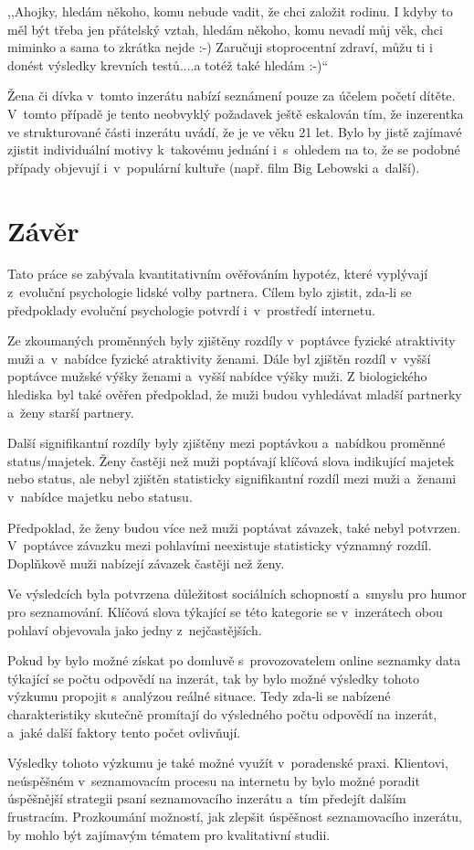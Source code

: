 \documentclass[a4paper, 12pt, notitlepage, oneside, numbers=noenddot]{report}
\begin{document}
,,Ahojky, hledám někoho, komu nebude vadit, že chci založit rodinu. I
kdyby to měl být třeba jen přátelský vztah, hledám někoho, komu nevadí
můj věk, chci miminko a sama to zkrátka nejde :-) Zaručuji
stoprocentní zdraví, můžu ti i donést výsledky krevních testů....a
totéž také hledám :-)``

Žena či dívka v~tomto inzerátu nabízí seznámení pouze za účelem početí
dítěte.  V~tomto případě je tento neobvyklý požadavek ještě eskalován
tím, že inzerentka ve strukturované části inzerátu uvádí, že je ve
věku 21 let. Bylo by jistě zajímavé zjistit individuální motivy
k~takovému jednání i~s~ohledem na to, že se podobné případy objevují
i~v~populární kultuře (např. film Big Lebowski a~další).

\chapter{Závěr}

Tato práce se zabývala kvantitativním ověřováním hypotéz, které
vyplývají z~evoluční psychologie lidské volby partnera.  Cílem bylo
zjistit, zda-li se předpoklady evoluční psychologie potvrdí
i~v~prostředí internetu.

Ze zkoumaných proměnných byly zjištěny rozdíly v~poptávce fyzické
atraktivity muži a~v~nabídce fyzické atraktivity ženami.  Dále byl
zjištěn rozdíl v~vyšší poptávce mužské výšky ženami a~vyšší nabídce
výšky muži.  Z biologického hlediska byl také ověřen před\-po\-klad, že
muži budou vyhledávat mladší partnerky a~ženy starší partnery.

Další signifikantní rozdíly byly zjištěny mezi poptávkou a~nabídkou
proměnné status/majetek.  Ženy častěji než muži poptávají klíčová
slova indikující majetek nebo status, ale nebyl zjištěn statisticky
signifikantní rozdíl mezi muži a~ženami v~nabídce majetku nebo statusu.

Předpoklad, že ženy budou více než muži poptávat závazek, také nebyl
potvrzen.  V~poptávce závazku mezi pohlavími neexistuje statisticky
významný rozdíl.  Doplňkově muži nabízejí závazek častěji než ženy.

Ve výsledcích byla potvrzena důležitost sociálních schopností a~smyslu
pro humor pro seznamování.  Klíčová slova týkající se této kategorie
se v~inzerátech obou pohlaví objevovala jako jedny z~nejčastějších.

Pokud by bylo možné získat po domluvě s~provozovatelem online seznamky
data týkající se počtu odpovědí na inzerát, tak by bylo možné výsledky
tohoto výzkumu propojit s~analýzou reálné situace.  Tedy zda-li se
nabízené charakteristiky skutečně promítají do výsledného počtu
odpovědí na inzerát, a~jaké další faktory tento počet ovlivňují.

Výsledky tohoto výzkumu je také možné využít v~poradenské praxi.
Klientovi, ne\-ús\-pě\-š\-ném v~seznamovacím procesu na internetu by bylo
možné poradit úspěšnější strategii psaní seznamovacího inzerátu a~tím
předejít dalším frustracím.  Prozkoumání možností, jak zlepšit
úspěšnost seznamovacího inzerátu, by mohlo být zajímavým tématem pro
kvalitativní studii.

\clearpage
\singlespacing

%

\end{document}

